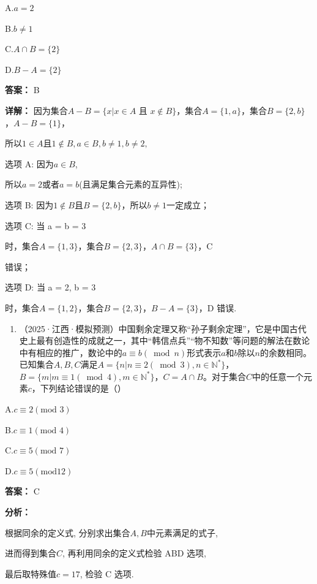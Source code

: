 \documentclass[11pt,a4paper]{ctexart}
\begin{document}
A.\(a = 2\)

B.\(b \neq  1\)

C.\(A \cap B = \{2\}\)

D.\(B - A = \{2\}\)

\textbf{答案：}
B

\textbf{详解：}
因为集合\(A - B = \{x|x \in A \text{ 且 } x \notin B\}\)，集合\(A = \{1, a\}\)，集合\(B = \{2, b\}\)，\(A - B = \{1\}\)，

所以\(1 \in A\)且\(1 \notin B, a \in B, b \neq 1, b \neq 2,\)

选项 A: 因为\(a \in B\),

所以\(a = 2\)或者\(a = b\)(且满足集合元素的互异性);

选项 B: 因为\(1 \notin B\)且\(B = \{2, b\}\)，所以\(b \neq 1\)一定成立；

选项 C: 当 a = b = 3

时，集合\(A = \{1,3\}\)，集合\(B = \{2,3\}\)，\(A \cap B = \{3\}\)，C

错误；

选项 D: 当 a = 2, b = 3

时，集合\(A = \{1, 2\}\)，集合\(B = \{2, 3\}\)，\(B-A=\{3\}\)，D 错误.

\begin{enumerate}[label=\arabic*., leftmargin=*, start=2]
\item （2025·江西·模拟预测）中国剩余定理又称``孙子剩余定理''，它是中国古代史上最有创造性的成就之一，其中``韩信点兵''``物不知数''等问题的解法在数论中有相应的推广，数论中的\(a \equiv b (\bmod n)\)形式表示\(a\)和\(b\)除以\(n\)的余数相同。已知集合\(A, B, C\)满足\(A = \{n | n \equiv 2 (\bmod 3), n \in \mathbb{N}^*\}\)，\(B = \{m | m \equiv 1 (\bmod 4), m \in \mathbb{N}^*\}\)，\(C = A \cap B\)。对于集合\(C\)中的任意一个元素\(c\)，下列结论错误的是（）
\end{enumerate}

A.\(c \equiv 2 (\text{mod } 3)\)

B.\(c \equiv 1 (\text{mod } 4)\)

C.\(c \equiv 5 (\text{mod } 7)\)

D.\(c \equiv 5 (\text{mod} 12)\)

\textbf{答案：}
C

\textbf{分析：}

根据同余的定义式, 分别求出集合\(A, B\)中元素满足的式子,

进而得到集合\(C\), 再利用同余的定义式检验 ABD 选项,

最后取特殊值\(c = 17\), 检验 C 选项.
\end{document}
